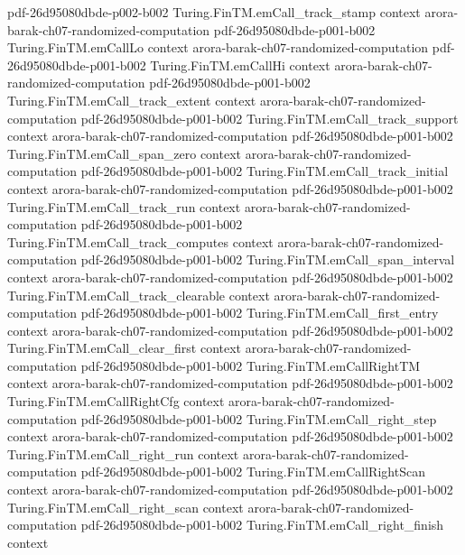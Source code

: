 \begin{theorem}
  {pdf-26d95080dbde-p002-b002}
\proofstep
  {Turing.FinTM.emCall_track_stamp}
  {context}
  {arora-barak-ch07-randomized-computation}
  {pdf-26d95080dbde-p001-b002}
\proofstep
  {Turing.FinTM.emCallLo}
  {context}
  {arora-barak-ch07-randomized-computation}
  {pdf-26d95080dbde-p001-b002}
\proofstep
  {Turing.FinTM.emCallHi}
  {context}
  {arora-barak-ch07-randomized-computation}
  {pdf-26d95080dbde-p001-b002}
\proofstep
  {Turing.FinTM.emCall_track_extent}
  {context}
  {arora-barak-ch07-randomized-computation}
  {pdf-26d95080dbde-p001-b002}
\proofstep
  {Turing.FinTM.emCall_track_support}
  {context}
  {arora-barak-ch07-randomized-computation}
  {pdf-26d95080dbde-p001-b002}
\proofstep
  {Turing.FinTM.emCall_span_zero}
  {context}
  {arora-barak-ch07-randomized-computation}
  {pdf-26d95080dbde-p001-b002}
\proofstep
  {Turing.FinTM.emCall_track_initial}
  {context}
  {arora-barak-ch07-randomized-computation}
  {pdf-26d95080dbde-p001-b002}
\proofstep
  {Turing.FinTM.emCall_track_run}
  {context}
  {arora-barak-ch07-randomized-computation}
  {pdf-26d95080dbde-p001-b002}
\proofstep
  {Turing.FinTM.emCall_track_computes}
  {context}
  {arora-barak-ch07-randomized-computation}
  {pdf-26d95080dbde-p001-b002}
\proofstep
  {Turing.FinTM.emCall_span_interval}
  {context}
  {arora-barak-ch07-randomized-computation}
  {pdf-26d95080dbde-p001-b002}
\proofstep
  {Turing.FinTM.emCall_track_clearable}
  {context}
  {arora-barak-ch07-randomized-computation}
  {pdf-26d95080dbde-p001-b002}
\proofstep
  {Turing.FinTM.emCall_first_entry}
  {context}
  {arora-barak-ch07-randomized-computation}
  {pdf-26d95080dbde-p001-b002}
\proofstep
  {Turing.FinTM.emCall_clear_first}
  {context}
  {arora-barak-ch07-randomized-computation}
  {pdf-26d95080dbde-p001-b002}
\proofstep
  {Turing.FinTM.emCallRightTM}
  {context}
  {arora-barak-ch07-randomized-computation}
  {pdf-26d95080dbde-p001-b002}
\proofstep
  {Turing.FinTM.emCallRightCfg}
  {context}
  {arora-barak-ch07-randomized-computation}
  {pdf-26d95080dbde-p001-b002}
\proofstep
  {Turing.FinTM.emCall_right_step}
  {context}
  {arora-barak-ch07-randomized-computation}
  {pdf-26d95080dbde-p001-b002}
\proofstep
  {Turing.FinTM.emCall_right_run}
  {context}
  {arora-barak-ch07-randomized-computation}
  {pdf-26d95080dbde-p001-b002}
\proofstep
  {Turing.FinTM.emCallRightScan}
  {context}
  {arora-barak-ch07-randomized-computation}
  {pdf-26d95080dbde-p001-b002}
\proofstep
  {Turing.FinTM.emCall_right_scan}
  {context}
  {arora-barak-ch07-randomized-computation}
  {pdf-26d95080dbde-p001-b002}
\proofstep
  {Turing.FinTM.emCall_right_finish}
  {context}

\end{theorem}
